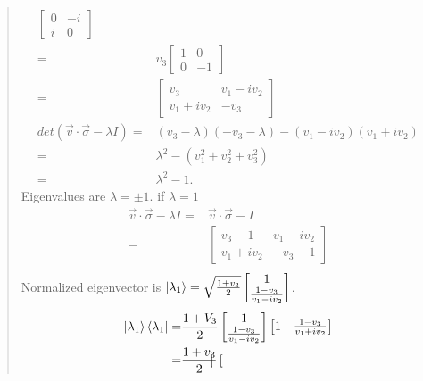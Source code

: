 \documentclass[UTF8]{ctexart}
\begin{document}
\begin{quote}
\begin{equation}
\begin{aligned}
\begin{bmatrix}
							0 &-i \\i & 0
						\end{bmatrix}\\
						=&v_{3}\begin{bmatrix}
							1 &0 \\0 & -1
						\end{bmatrix} \\
						=&\begin{bmatrix}
							v_{3} & v_{1}-iv_{2} \\
							v_{1}+iv_{2} & -v_{3}
						\end{bmatrix} \\
	det(\vec{v}\cdot\vec{\sigma}-\lambda I)=&(v_{3}-\lambda)(-v_{3}-\lambda)
										  -(v_{1}-iv_{2})(v_{1}+iv_{2}) \\
										  =&\lambda^{2}-(v_{1}^{2}+v_{2}^{2}+v_{3}^{2}) \\
										  =&\lambda^{2}-1.
	\end{aligned}
	\end{equation}
	Eigenvalues are $λ = \pm1.$
	if $\lambda=1$
	\begin{equation}
		\begin{aligned}
			\vec{v}\cdot\vec{\sigma}-\lambda I=& \vec{v}\cdot\vec{\sigma}-I\\
											  =&\begin{bmatrix}
												  v_{3}-1 & v_{1}-iv_{2}\\
												  v_{1}+iv_{2} & -v_{3}-1
											  \end{bmatrix} \\
	\end{aligned} 
	\end{equation}
	Normalized eigenvector is $\ket{\lambda_{1}}=\sqrt{\frac{1+v_{3}}{2}}
	\begin{bmatrix}
		1 \\ \frac{1-v_{3}}{v_{1}-iv_{2}}
	\end{bmatrix}$.
	\begin{equation}
		\begin{aligned}
			\ket{\lambda_{1}}\bra{\lambda_{1}}=&\frac{1+V_{3}}{2}\begin{bmatrix}
				1 \\ \frac{1-v_{3}}{v_{1}-iv_{2}}
			\end{bmatrix}
			\begin{bmatrix}
				1 & \frac{1-v_{3}}{v_{1}+iv_{2}}
			\end{bmatrix} \\
			=&\frac{1+v_{3}}{2} \begin{bmatrix}

\end{bmatrix}
\end{aligned}
\end{equation}
\end{quote}
\end{document}
